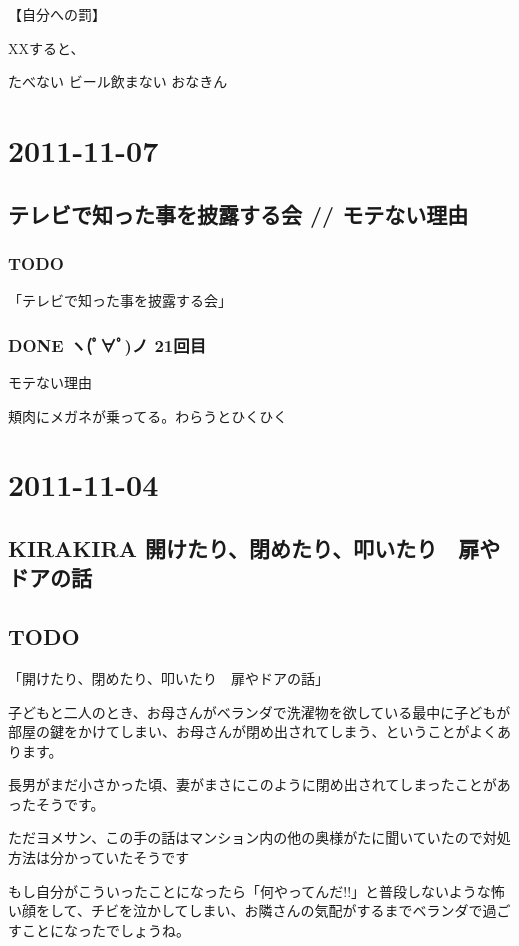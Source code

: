 \documentclass[11pt]{article}
\begin{document}
【自分への罰】

XXすると、

たべない
ビール飲まない
おなきん
\section{2011-11-07}
\label{sec-43}
\subsection{テレビで知った事を披露する会 // モテない理由}
\label{sec-43_1}
\subsubsection{\textbf{TODO}}
\label{sec-43_1_1}

「テレビで知った事を披露する会」
\subsubsection{\textbf{DONE} ヽ(ﾟ∀ﾟ)ノ 21回目}
\label{sec-43_1_2}

モテない理由

頬肉にメガネが乗ってる。わらうとひくひく
\section{2011-11-04}
\label{sec-44}
\subsection{KIRAKIRA 開けたり、閉めたり、叩いたり　扉やドアの話}
\label{sec-44_1}
\subsection{\textbf{TODO}}
\label{sec-44_2}

「開けたり、閉めたり、叩いたり　扉やドアの話」

子どもと二人のとき、お母さんがベランダで洗濯物を欲している最中に子どもが部屋の鍵をかけてしまい、お母さんが閉め出されてしまう、ということがよくあります。

長男がまだ小さかった頃、妻がまさにこのように閉め出されてしまったことがあったそうです。

ただヨメサン、この手の話はマンション内の他の奥様がたに聞いていたので対処方法は分かっていたそうです

もし自分がこういったことになったら「何やってんだ!!」と普段しないような怖い顔をして、チビを泣かしてしまい、お隣さんの気配がするまでベランダで過ごすことになったでしょうね。
\end{document}

